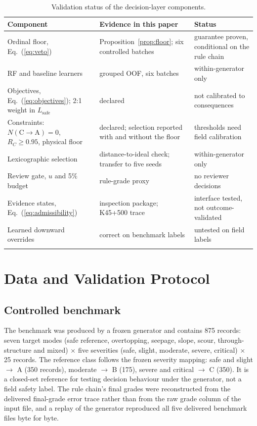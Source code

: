 \documentclass[journal]{IEEEtran}
\newcommand{\Lsafe}{L_{\mathrm{safe}}}
\begin{document}
\begin{table}[t]
\caption{Validation status of the decision-layer components.}
\label{tab:status}
\centering
\footnotesize
\setlength{\tabcolsep}{3pt}
\begin{tabular}{@{}>{\raggedright\arraybackslash}p{}>{\raggedright\arraybackslash}p{}>{\raggedright\arraybackslash}p{}@{}}
\toprule
Component & Evidence in this paper & Status \\
\midrule
Ordinal floor, Eq.~(\ref{eq:veto}) & Proposition~\ref{prop:floor}; six controlled batches & guarantee proven, conditional on the rule chain \\
\addlinespace[0.5pt]
RF and baseline learners & grouped OOF, six batches & within-generator only \\
\addlinespace[0.5pt]
Objectives, Eq.~(\ref{eq:objectives}); 2:1 weight in $\Lsafe$ & declared & not calibrated to consequences \\
\addlinespace[0.5pt]
Constraints: $N(\mathrm{C}\rightarrow\mathrm{A})=0$, $R_C\geq0.95$, physical floor & declared; selection reported with and without the floor & thresholds need field calibration \\
\addlinespace[0.5pt]
Lexicographic selection & distance-to-ideal check; transfer to five seeds & within-generator only \\
\addlinespace[0.5pt]
Review gate, $u$ and 5\% budget & rule-grade proxy & no reviewer decisions \\
\addlinespace[0.5pt]
Evidence states, Eq.~(\ref{eq:admissibility}) & inspection package; K45+500 trace & interface tested, not outcome-validated \\
\addlinespace[0.5pt]
Learned downward overrides & correct on benchmark labels & untested on field labels \\
\addlinespace[0.5pt]
\bottomrule
\end{tabular}
\end{table}

\section{Data and Validation Protocol}
\label{sec:protocol}
\subsection{Controlled benchmark}
The benchmark was produced by a frozen generator and contains 875 records: seven target modes (safe reference, overtopping, seepage, slope, scour, through-structure and mixed) $\times$ five severities (safe, slight, moderate, severe, critical) $\times$ 25 records. The reference class follows the frozen severity mapping: safe and slight $\rightarrow$ A (350 records), moderate $\rightarrow$ B (175), severe and critical $\rightarrow$ C (350). It is a closed-set reference for testing decision behaviour under the generator, not a field safety label. The rule chain's final grades were reconstructed from the delivered final-grade error trace rather than from the raw grade column of the input file, and a replay of the generator reproduced all five delivered benchmark files byte for byte.
\end{document}
